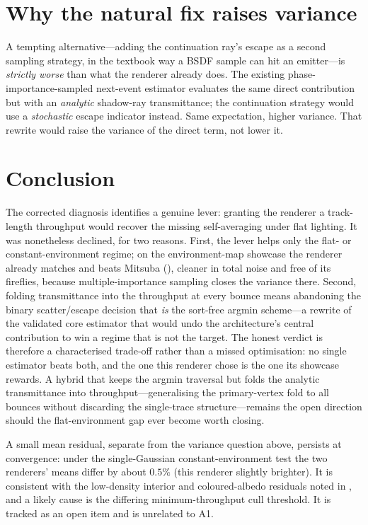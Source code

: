 \section{Why the natural fix raises variance}
\label{sec:a1-fix}

A tempting alternative---adding the continuation ray's escape as a second sampling strategy, in the
textbook way a BSDF sample can hit an emitter---is \emph{strictly worse} than what the renderer
already does. The existing phase-importance-sampled next-event estimator evaluates the same direct
contribution but with an \emph{analytic} shadow-ray transmittance; the continuation strategy would
use a \emph{stochastic} escape indicator instead. Same expectation, higher variance. That rewrite
would raise the variance of the direct term, not lower it.

\section{Conclusion}
\label{sec:a1-conclusion}

The corrected diagnosis identifies a genuine lever: granting the renderer a track-length throughput
would recover the missing self-averaging under flat lighting. It was nonetheless declined, for two
reasons. First, the lever helps only the flat- or constant-environment regime; on the environment-map
showcase the renderer already matches and beats Mitsuba (), cleaner in total noise
and free of its fireflies, because multiple-importance sampling closes the variance there. Second,
folding transmittance into the throughput at every bounce means abandoning the binary scatter/escape
decision that \emph{is} the sort-free argmin scheme---a rewrite of the validated core estimator that
would undo the architecture's central contribution to win a regime that is not the target. The honest
verdict is therefore a characterised trade-off rather than a missed optimisation: no single estimator
beats both, and the one this renderer chose is the one its showcase rewards. A hybrid that keeps the
argmin traversal but folds the analytic transmittance into throughput---generalising the primary-vertex
fold to all bounces without discarding the single-trace structure---remains the open direction should
the flat-environment gap ever become worth closing.

A small mean residual, separate from the variance question above, persists at convergence: under the
single-Gaussian constant-environment test the two renderers' means differ by about $0.5\%$ (this
renderer slightly brighter). It is consistent with the low-density interior and coloured-albedo
residuals noted in , and a likely cause is the differing minimum-throughput cull
threshold. It is tracked as an open item and is unrelated to A1.
